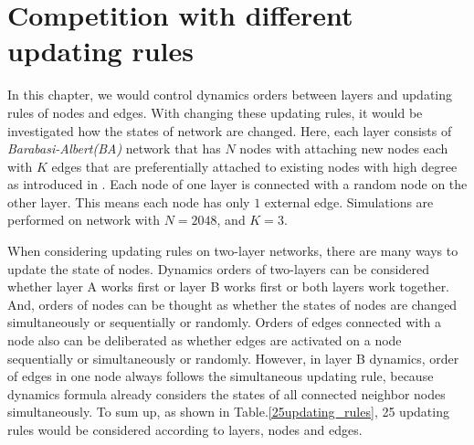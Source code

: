 
\chapter{Competition with different updating rules}
\label{chap4}
In this chapter, we would control dynamics orders between layers and updating rules of nodes and edges. With changing these updating rules, it would be investigated how the states of network are changed. Here, each layer consists of \textit{Barabasi-Albert(BA)} network that has $N$ nodes with attaching new nodes each with $K$ edges that are preferentially attached to existing nodes with high degree as introduced in \parencite{barabasi1999}. Each node of one layer is connected with a random node on the other layer. This means each node has only $1$ external edge. Simulations are performed on network with $N=2048$, and $K=3$.

When considering updating rules on two-layer networks, there are many ways to update the state of nodes. Dynamics orders of two-layers can be considered whether layer A works first or layer B works first or both layers work together. And, orders of nodes can be thought as whether the states of nodes are changed simultaneously or sequentially or randomly. Orders of edges connected with a node also can be deliberated as whether edges are activated on a node sequentially or simultaneously or randomly. However, in layer B dynamics, order of edges in one node always follows the simultaneous updating rule, because dynamics formula already considers the states of all connected neighbor nodes simultaneously. To sum up, as shown in Table.\ref{25updating_rules}, 25 updating rules would be considered according to layers, nodes and edges. \\

